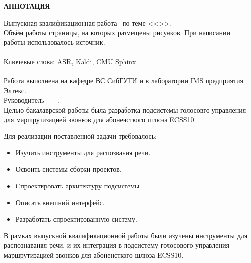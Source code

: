 \begin{center}
    \bf
    АННОТАЦИЯ
\end{center}


\noindent
Выпускная квалификационная работа \fioa\ по теме <<\topicname>>.
\hfill \\
Объём работы \pageref{LastPage} страницы, на которых размещены  рисунков.
При написании работы использовалось  источник. \\
\hfill \\
Ключевые слова: ASR, Kaldi, CMU Sphinx \\
\hfill \\
Работа выполнена на кафедре ВС СибГУТИ и в лаборатории IMS предприятия Элтекс. \\
Руководитель~--~\theadpos~\thead, \\


Целью бакалаврской работы была разработка подсистемы голосовго управления
для маршрутизацией звонков для абоненсткого шлюза ECSS10.


Для реализации поставленной задачи требовалось:
\begin{itemize}
    \item Изучить инструменты для распозвания речи.
    \item Освоить системы сборки проектов.
    \item Спроектировать архитектуру подсистемы.
    \item Описать внешний интерфейс.
    \item Разработать спроектированную систему.
\end{itemize}


В рамках выпускной квалификационной работы были изучены инструменты для
распознавания речи, и их интеграция в подсистему голосового управления
маршрутизацией звонков для абоненсткого шлюза ECSS10.


\thispagestyle{empty}
